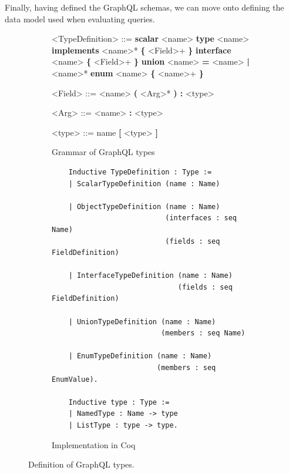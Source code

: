 
Finally, having defined the GraphQL schemas, we can move onto defining the data model used when evaluating queries.

\setlength{\grammarparsep}{20pt plus 1pt minus 1pt} %
\begin{figure}
    \centering
    \begin{subfigure}{.5\textwidth}
    \begin{grammar}
    <TypeDefinition> ::= \textbf{scalar} <name>
    \alt \textbf{type} <name> \textbf{implements} <name>* \textbf{\{} <Field>+ \textbf{\}}
    \alt \textbf{interface} <name> \textbf{\{} <Field>+ \textbf{\}}
    \alt \textbf{union} <name> \textbf{=} <name> \textbf{|} <name>*
    \alt \textbf{enum} <name> \textbf{\{} <name>+ \textbf{\}}

    <Field> ::= <name> \textbf{(} <Arg>* \textbf{) :} <type>

    <Arg> ::= <name> \textbf{:} <type>

    <type> ::= name
    \alt \textbf{[}  <type> \textbf{]}
    \end{grammar}

    \caption{Grammar of GraphQL types}
    \end{subfigure}%
    \begin{subfigure}{.5\textwidth}
    \begin{verbatim}
    Inductive TypeDefinition : Type :=
    | ScalarTypeDefinition (name : Name)

    | ObjectTypeDefinition (name : Name)
                           (interfaces : seq Name)
                           (fields : seq FieldDefinition)

    | InterfaceTypeDefinition (name : Name)
                              (fields : seq FieldDefinition)

    | UnionTypeDefinition (name : Name)
                          (members : seq Name)

    | EnumTypeDefinition (name : Name)
                         (members : seq EnumValue).

    Inductive type : Type :=
    | NamedType : Name -> type
    | ListType : type -> type.
    \end{verbatim}

    \caption{Implementation in Coq}
    \end{subfigure}
    \caption{Definition of GraphQL types.}
    \label{fig:types_def}
\end{figure}



